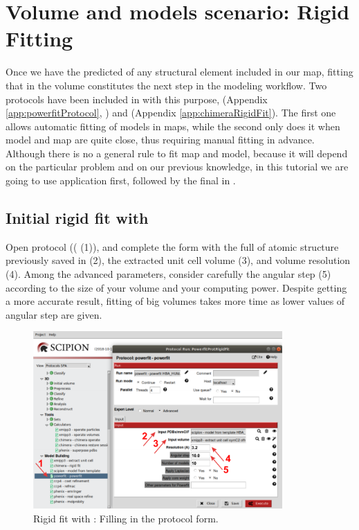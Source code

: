\section{Volume and models scenario: Rigid Fitting}
Once we have the predicted  of any structural element included in our map, fitting that  in the volume constitutes the next step in the modeling workflow. Two protocols have been included in \scipion with this purpose, \powerfit (Appendix \ref{app:powerfitProtocol}, \citep{vanzundert2016}) and  (Appendix \ref{app:chimeraRigidFit}). The first one allows automatic fitting of models in maps, while the second only does it when model and map are quite close, thus requiring manual fitting in advance. Although there is no a general rule to fit map and model, because it will depend on the particular problem and on our previous knowledge, in this tutorial we are going to use \powerfit application first, followed by the final  in \chimera {}. 

\subsection*{Initial rigid fit with \powerfit}
 Open  protocol (( (1)), and complete the form with the full  of atomic structure previously saved in \chimera (2), the extracted unit cell volume (3), and volume resolution (4). Among the advanced parameters, consider carefully the angular step (5) according to the size of your volume and your computing power. Despite getting a more accurate result, fitting of big volumes takes more time as  lower values of angular step are given.  
 
 \begin{figure}[H]
  \centering 
  \captionsetup{width=.7\linewidth} 
  \includegraphics[width=0.85\textwidth]{Images/Fig18}
  \caption{Rigid fit with \powerfit: Filling in the protocol form.}
  \label{fig:powerfit_protocol}
  \end{figure}
 
